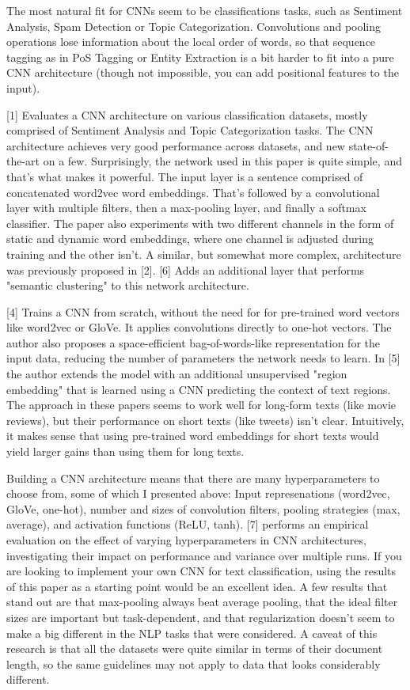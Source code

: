 \documentclass[UTF8,10pt,a4paper]{ctexbook}
\begin{document}
The most natural fit for CNNs seem to be classifications tasks, such as Sentiment Analysis, Spam Detection or Topic Categorization. Convolutions and pooling operations lose information about the local order of words, so that sequence tagging as in PoS Tagging or Entity Extraction is a bit harder to fit into a pure CNN architecture (though not impossible, you can add positional features to the input).

[1] Evaluates a CNN architecture on various classification datasets, mostly comprised of Sentiment Analysis and Topic Categorization tasks. The CNN architecture achieves very good performance across datasets, and new state-of-the-art on a few. Surprisingly, the network used in this paper is quite simple, and that's what makes it powerful. The input layer is a sentence comprised of concatenated word2vec word embeddings. That's followed by a convolutional layer with multiple filters, then a max-pooling layer, and finally a softmax classifier. The paper also experiments with two different channels in the form of static and dynamic word embeddings, where one channel is adjusted during training and the other isn't. A similar, but somewhat more complex, architecture was previously proposed in [2]. [6] Adds an additional layer that performs "semantic clustering" to this network architecture.

[4] Trains a CNN from scratch, without the need for for pre-trained word vectors like word2vec or GloVe. It applies convolutions directly to one-hot vectors. The author also proposes a space-efficient bag-of-words-like representation for the input data, reducing the number of parameters the network needs to learn. In [5] the author extends the model with an additional unsupervised "region embedding" that is learned using a CNN predicting the context of text regions. The approach in these papers seems to work well for long-form texts (like movie reviews), but their performance on short texts (like tweets) isn't clear. Intuitively, it makes sense that using pre-trained word embeddings for short texts would yield larger gains than using them for long texts.

Building a CNN architecture means that there are many hyperparameters to choose from, some of which I presented above: Input represenations (word2vec, GloVe, one-hot), number and sizes of convolution filters, pooling strategies (max, average), and activation functions (ReLU, tanh). [7] performs an empirical evaluation on the effect of varying hyperparameters in CNN architectures, investigating their impact on performance and variance over multiple runs. If you are looking to implement your own CNN for text classification, using the results of this paper as a starting point would be an excellent idea. A few results that stand out are that max-pooling always beat average pooling, that the ideal filter sizes are important but task-dependent, and that regularization doesn't seem to make a big different in the NLP tasks that were considered. A caveat of this research is that all the datasets were quite similar in terms of their document length, so the same guidelines may not apply to data that looks considerably different.
\end{document}
